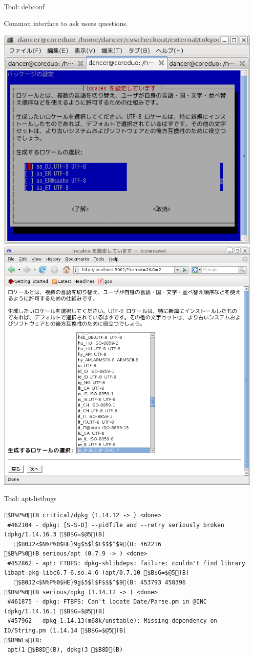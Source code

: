 \documentclass[cjk,dvipdfm,12pt]{beamer}
\begin{document}
\begin{frame}{Tool: debconf}

Common interface to ask users questions.

 \includegraphics[width=0.5\hsize]{image200805/debconf-text.png}
 \includegraphics[width=0.5\hsize]{image200805/debconf-locales.png}

\end{frame}

\begin{frame}[containsverbatim]{Tool: apt-listbugs}
\begin{verbatim}
$B%P%0(B critical/dpkg (1.14.12 -> ) <done>
 #462104 - dpkg: [S-S-D] --pidfile and --retry seriously broken (dpkg/1.14.16.3 $B$G=$@5(B)
   $B0J2<$N%P%0$HE}9g$5$l$F$$$^$9(B: 462216
$B%P%0(B serious/apt (0.7.9 -> ) <done>
 #452862 - apt: FTBFS: dpkg-shlibdeps: failure: couldn't find library libapt-pkg-libc6.7-6.so.4.6 (apt/0.7.10 $B$G=$@5(B)
   $B0J2<$N%P%0$HE}9g$5$l$F$$$^$9(B: 453793 458396
$B%P%0(B serious/dpkg (1.14.12 -> ) <done>
 #461875 - dpkg: FTBFS: Can't locate Date/Parse.pm in @INC (dpkg/1.14.16.1 $B$G=$@5(B)
 #457962 - dpkg_1.14.13(m68k/unstable): Missing dependency on IO/String.pm (1.14.14 $B$G=$@5(B)
$BMWLs(B:
 apt(1 $B8D(B), dpkg(3 $B8D(B)
\end{verbatim}
\end{frame}
\end{document}
